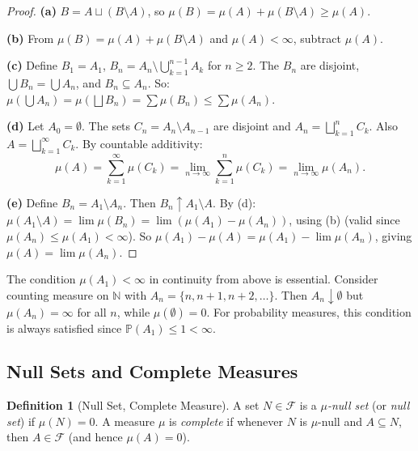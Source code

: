 \documentclass[11pt,a4paper]{article}
\theoremstyle{definition}
\newtheorem{definition}{Definition}[section]
\theoremstyle{plain}
\theoremstyle{remark}
\newcommand{\N}{\mathbb{N}}
\newcommand{\Prob}{\mathbb{P}}
\begin{document}
\begin{proof}
\textbf{(a)} $B = A \sqcup (B \setminus A)$, so $\mu(B) = \mu(A) + \mu(B \setminus A) \geq \mu(A)$.

\textbf{(b)} From $\mu(B) = \mu(A) + \mu(B \setminus A)$ and $\mu(A) < \infty$, subtract $\mu(A)$.

\textbf{(c)} Define $B_1 = A_1$, $B_n = A_n \setminus \bigcup_{k=1}^{n-1} A_k$ for $n \geq 2$. The $B_n$ are disjoint, $\bigcup B_n = \bigcup A_n$, and $B_n \subseteq A_n$. So:
$\mu(\bigcup A_n) = \mu(\bigsqcup B_n) = \sum \mu(B_n) \leq \sum \mu(A_n)$.

\textbf{(d)} Let $A_0 = \emptyset$. The sets $C_n = A_n \setminus A_{n-1}$ are disjoint and $A_n = \bigsqcup_{k=1}^n C_k$. Also $A = \bigsqcup_{k=1}^\infty C_k$. By countable additivity:
\begin{equation}
    \mu(A) = \sum_{k=1}^\infty \mu(C_k) = \lim_{n \to \infty} \sum_{k=1}^n \mu(C_k) = \lim_{n \to \infty} \mu(A_n).
\end{equation}

\textbf{(e)} Define $B_n = A_1 \setminus A_n$. Then $B_n \uparrow A_1 \setminus A$. By (d):
$\mu(A_1 \setminus A) = \lim \mu(B_n) = \lim (\mu(A_1) - \mu(A_n))$, using (b) (valid since $\mu(A_n) \leq \mu(A_1) < \infty$). So $\mu(A_1) - \mu(A) = \mu(A_1) - \lim \mu(A_n)$, giving $\mu(A) = \lim \mu(A_n)$.
\end{proof}

\begin{warning}
The condition $\mu(A_1) < \infty$ in continuity from above is essential. Consider
counting measure on $\N$ with $A_n = \{n, n+1, n+2, \ldots\}$. Then $A_n \downarrow \emptyset$
but $\mu(A_n) = \infty$ for all $n$, while $\mu(\emptyset) = 0$. For probability
measures, this condition is always satisfied since $\Prob(A_1) \leq 1 < \infty$.
\end{warning}

\subsection{Null Sets and Complete Measures}
\label{subsec:null_sets}

\begin{definition}[Null Set, Complete Measure]
\label{def:null_complete}
A set $N \in \mathcal{F}$ is a \emph{$\mu$-null set} (or \emph{null set}) if $\mu(N) = 0$.
A measure $\mu$ is \emph{complete} if whenever $N$ is $\mu$-null and $A \subseteq N$,
then $A \in \mathcal{F}$ (and hence $\mu(A) = 0$).
\end{definition}
\end{document}
